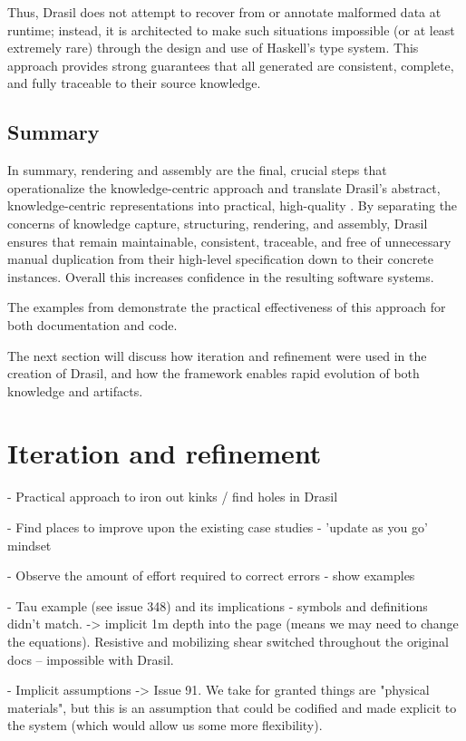 Thus, Drasil does not attempt to recover from or annotate malformed data at 
runtime; instead, it is architected to make such situations impossible (or at 
least extremely rare) through the design and use of Haskell's type system. This 
approach provides strong guarantees that all generated \sfs{} are 
consistent, complete, and fully traceable to their source knowledge.

\subsection{Summary}
In summary, rendering and assembly are the final, crucial steps that 
operationalize the knowledge-centric approach and translate Drasil's abstract, 
knowledge-centric representations into practical, high-quality \sfs{}. By 
separating the concerns of knowledge capture, structuring, rendering, and 
assembly, Drasil ensures that \sfs{} remain maintainable, consistent, 
traceable, and free of unnecessary manual duplication from their high-level 
specification down to their concrete instances. Overall this increases 
confidence in the resulting software systems.

The examples from \gb{} demonstrate the practical effectiveness of this 
approach for both documentation and code.

The next section will discuss how iteration and refinement were used in the 
creation of Drasil, and how the framework enables rapid evolution of both 
knowledge and artifacts.

\section{Iteration and refinement}
\label{sec:iterefine}

  - Practical approach to iron out kinks / find holes in Drasil

  - Find places to improve upon the existing case studies - 'update as you go' 
  mindset

  - Observe the amount of effort required to correct errors - show examples

  - Tau example (see issue 348) and its implications - symbols and definitions 
  didn't match. -> implicit 1m depth into the page (means we may need to change 
  the equations). Resistive and mobilizing shear switched throughout the 
  original docs -- impossible with Drasil.

  -  Implicit assumptions -> 
  Issue 91. We take for granted things are "physical 
  materials", but this is an assumption that could be codified and made 
  explicit to the system (which would allow us some more flexibility).